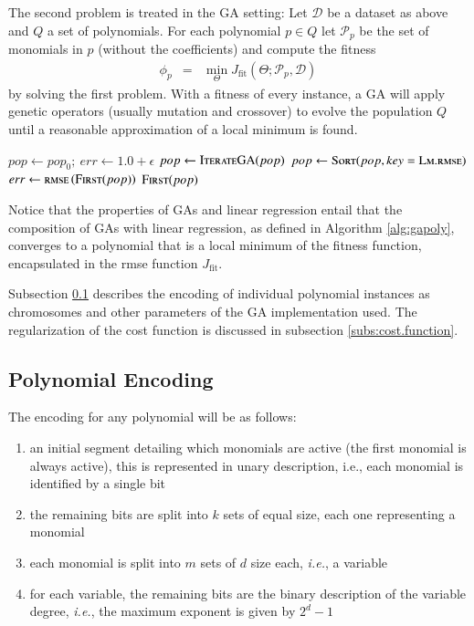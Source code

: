 \documentclass{elsarticle}
\begin{document}
The second problem is treated in the \ac{GA} setting: Let $\mathcal{D}$ be a dataset as above and $Q$ a set of polynomials. For each polynomial $p\in Q$ let $\mathcal{P}_p$ be the set of monomials in $p$ (without the coefficients) and compute the fitness
%
\begin{eqnarray*}
\phi_p &=& \min_\Theta J_{\textrm{fit}}\left(\Theta;\mathcal{P}_p,\mathcal{D}\right)
\end{eqnarray*}
%
by solving the first problem. With a fitness of every instance, a \ac{GA} will apply genetic operators (usually mutation and crossover) to evolve the population $Q$ until a reasonable approximation of a local minimum is found. 
%
\begin{algorithm}[tb]
\begin{algorithmic}
	\State $pop \gets pop_0;\: err \gets 1.0+\epsilon$
		\State $pop \gets \Call{IterateGA}{pop}$
		\State $pop \gets \Call{Sort}{pop, key = \textsc{Lm.rmse}}$
		\State $err \gets \textsc{rmse}\left(\Call{First}{pop}\right)$
	\EndWhile
	\State\Return $\Call{First}{pop}$
\EndFunction
\end{algorithmic}
\caption{\ac{GAPoly} uses linear regression to find monomial coefficients that minimize the \ac{rmse} over a dataset and \acp{GA} to explore the space of polynomials. At exit the \ac{rmse} of the fittest instance is bounded by $\epsilon$.}\label{alg:gapoly}
\end{algorithm} 
%
Notice that the properties of \acp{GA} and linear regression entail that
the composition of \acp{GA} with linear regression, as defined in Algorithm \ref{alg:gapoly}, converges to a polynomial that is a local minimum of the fitness function, encapsulated in the \ac{rmse} function $J_{\textrm{fit}}$.
%

%
Subsection \ref{subs:polynomial.encoding} describes the encoding of individual polynomial instances as chromosomes and other parameters of the \ac{GA} implementation used. The regularization of the cost function is discussed in subsection \ref{subs:cost.function}.

%
\subsection{Polynomial Encoding}\label{subs:polynomial.encoding}
%
The encoding for any polynomial will be as follows:
\begin{enumerate}
\item an initial segment detailing which monomials are active (the first monomial is always active), this is represented in unary description, i.e., each monomial is identified by a single bit
\item the remaining bits are split into $k$ sets of equal size, each one representing a monomial
\item each monomial is split into $m$ sets of $d$ size each, \emph{i.e.}, a variable
\item for each variable, the remaining bits are the binary description of the variable degree, \emph{i.e.}, the maximum exponent is given by $2^d-1$
\end{enumerate}
\end{document}
